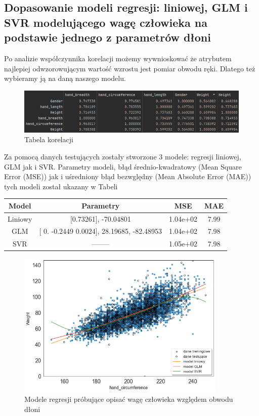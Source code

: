 \documentclass{article}
\begin{document}
\subsection{Dopasowanie modeli regresji: liniowej, GLM i SVR modelującego wagę człowieka na podstawie jednego z parametrów dłoni}
Po analizie współczynnika korelacji możemy wywnioskować że atrybutem najlepiej odwzorowującym wartość wzrostu jest pomiar obwodu ręki. Dlatego też wybieramy ją na daną naszego modelu.
\begin{figure}[H]
    \centering
    \includegraphics[width=12cm]{Weight_corr.png}
    \caption{Tabela korelacji}
    \label{fig:my_img}
\end{figure}
Za pomocą danych testujących zostały stworzone 3 modele: regresji liniowej, GLM jak i SVR. Parametry modeli, błąd średnio-kwadratowy (Mean Square Error (MSE)) jak i uśredniony błąd bezwględny (Mean Absolute Error (MAE)) tych modeli został ukazany w Tabeli
\begin{center}
\begin{tabular}{ |c|c|c|c| } 
 \hline
 Model & Parametry & MSE & MAE  \\ 
 \hline
 \hline
 Liniowy & [0.73261], -70.04801 & 1.04e+02 & 7.99 \\ 
 \hline
 GLM & [ 0.     -0.2449  0.0024], 28.19685, -82.48953 & 1.04e+02 & 7.98 \\
 \hline
 SVR  & ——– & 1.05e+02 & 7.98   \\
 \hline
\end{tabular}
\end{center}
\begin{figure}[H]
    \centering
    \includegraphics[width=10cm]{modelregresjiwaga.png}
    \caption{Modele regresji próbujące opisać wagę człowieka względem obwodu dłoni}
    \label{fig:my_img}
\end{figure}
\end{document}
